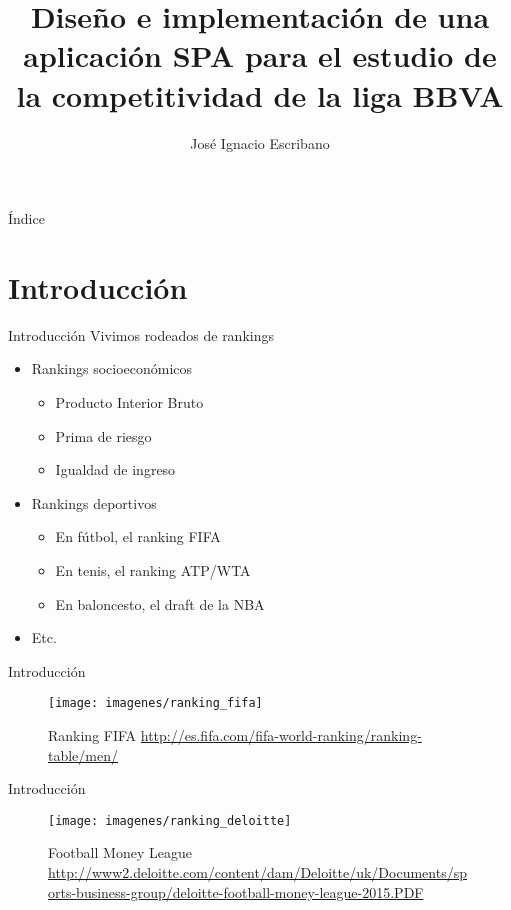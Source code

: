 \documentclass[11pt]{beamer}
\author{José Ignacio Escribano}
\title{Diseño e implementación de una aplicación SPA para el estudio de la competitividad de la liga BBVA}
\institute{URJC}
\date{}
\begin{document}
	
	\begin{frame}
		\maketitle
	\end{frame}

	\begin{frame}[allowframebreaks]{Índice}
		\tableofcontents
	\end{frame}
	
	
	\section{Introducción}
	
	\begin{frame}{Introducción}
		Vivimos rodeados de rankings
		
		\begin{itemize}
			\item Rankings socioeconómicos
			\begin{itemize}
				\item Producto Interior Bruto
				\item Prima de riesgo
				\item Igualdad de ingreso
			\end{itemize}
			\item Rankings deportivos
			\begin{itemize}
				\item En fútbol, el ranking FIFA
				\item En tenis, el ranking ATP/WTA
				\item En baloncesto, el draft de la NBA
			\end{itemize}
			\item Etc.
		\end{itemize}
	\end{frame}
	
	\begin{frame}{Introducción}
		\begin{figure}
			\centering
			\texttt{[image: imagenes/ranking\_fifa]}
			\caption{Ranking FIFA \url{http://es.fifa.com/fifa-world-ranking/ranking-table/men/}}
			\label{fig:ranking_fifa}
		\end{figure}
	\end{frame}
	
	\begin{frame}{Introducción}
		\begin{figure}
			\centering
			\texttt{[image: imagenes/ranking\_deloitte]}
			\caption{Football Money League \url{http://www2.deloitte.com/content/dam/Deloitte/uk/Documents/sports-business-group/deloitte-football-money-league-2015.PDF}}
			\label{fig:ranking_deloitte}
		\end{figure}
	\end{frame}
	
\end{document}
